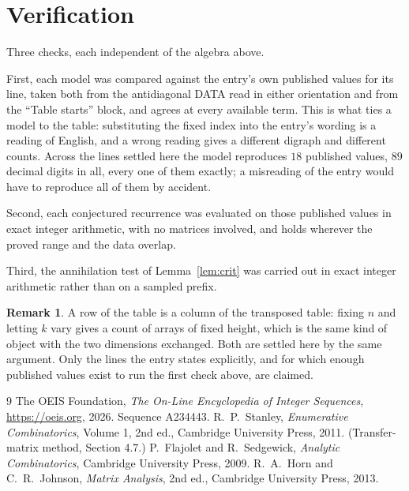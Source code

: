 \documentclass[11pt,a4paper]{article}
\theoremstyle{plain}
\theoremstyle{definition}
\newtheorem{remark}[theorem]{Remark}
\begin{document}
\section{Verification}

Three checks, each independent of the algebra above.

First, each model was compared against the entry's own published values for its line, taken
both from the antidiagonal DATA read in either orientation and from the ``Table starts''
block, and agrees at every available term. This is what ties a model to the table:
substituting the fixed index into the entry's wording is a reading of English, and a wrong
reading gives a different digraph and different counts. Across the lines settled here the
model reproduces $18$ published values, $89$ decimal digits in all, every one of
them exactly; a misreading of the entry would have to reproduce all of them by accident.

Second, each conjectured recurrence was evaluated on those published values in exact
integer arithmetic, with no matrices involved, and holds wherever the proved range and the
data overlap.

Third, the annihilation test of Lemma~\ref{lem:crit} was carried out in exact integer
arithmetic rather than on a sampled prefix.

\begin{remark}
A row of the table is a column of the transposed table: fixing $n$ and letting $k$ vary gives a
count of arrays of fixed height, which is the same kind of object with the two dimensions
exchanged. Both are settled here by the same argument. Only the lines the entry states
explicitly, and for which enough published values exist to run the first check above, are
claimed.
\end{remark}

\begin{thebibliography}{9}
 The OEIS Foundation, \emph{The On-Line Encyclopedia of Integer
Sequences}, \url{https://oeis.org}, 2026. Sequence A234443.
 R.~P.~Stanley, \emph{Enumerative Combinatorics}, Volume 1, 2nd ed.,
Cambridge University Press, 2011. (Transfer-matrix method, Section 4.7.)
 P.~Flajolet and R.~Sedgewick, \emph{Analytic Combinatorics}, Cambridge
University Press, 2009.
 R.~A.~Horn and C.~R.~Johnson, \emph{Matrix Analysis}, 2nd ed., Cambridge
University Press, 2013.
\end{thebibliography}
\end{document}
